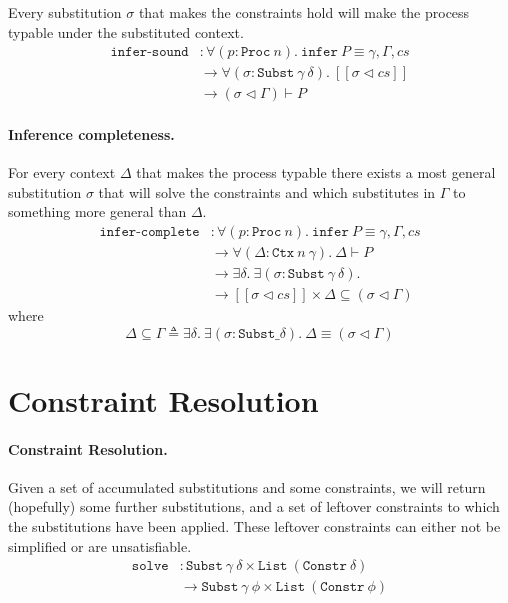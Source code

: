 \documentclass[sigplan,review,screen]{acmart}
\begin{document}
Every substitution \(\sigma\) that makes the constraints hold will make
the process typable under the substituted context. \[
\begin{aligned}
\texttt{infer-sound} &: \forall (p : \texttt{Proc}~n). ~ \texttt{infer}~P \equiv \gamma , \Gamma , cs \\
&\to \forall (\sigma : \texttt{Subst}~\gamma~\delta). ~ [\![ \sigma \triangleleft cs ]\!] \\
&\to (\sigma \triangleleft \Gamma) \vdash P
\end{aligned}
\]

\paragraph{Inference completeness.}

For every context \(\Delta\) that makes the process typable there exists
a most general substitution \(\sigma\) that will solve the constraints
and which substitutes in \(\Gamma\) to something more general than
\(\Delta\). \[
\begin{aligned}
\texttt{infer-complete} &: \forall (p : \texttt{Proc}~n). ~ \texttt{infer}~P \equiv \gamma , \Gamma , cs \\
&\to \forall (\Delta : \texttt{Ctx}~n~\gamma). ~ \Delta \vdash P \\
&\to \exists \delta. ~ \exists (\sigma : \texttt{Subst}~\gamma~\delta). \\
&\to [\![ \sigma \triangleleft cs ]\!] \times \Delta \subseteq (\sigma \triangleleft \Gamma)
\end{aligned}
\] where \[
\Delta \subseteq \Gamma \triangleq \exists \delta. ~ \exists (\sigma : \texttt{Subst} \_ \delta). ~ \Delta \equiv (\sigma \triangleleft \Gamma)
\]

\hypertarget{constraint-resolution}{%
\section{Constraint Resolution}\label{constraint-resolution}}

\paragraph{Constraint Resolution.}

Given a set of accumulated substitutions and some constraints, we will
return (hopefully) some further substitutions, and a set of leftover
constraints to which the substitutions have been applied. These leftover
constraints can either not be simplified or are unsatisfiable. \[
\begin{aligned}
\texttt{solve} &: \texttt{Subst}~\gamma~\delta \times \texttt{List}~(\texttt{Constr}~\delta) \\
&\to \texttt{Subst}~\gamma~\phi \times \texttt{List}~(\texttt{Constr}~\phi)
\end{aligned}
\]
\end{document}
